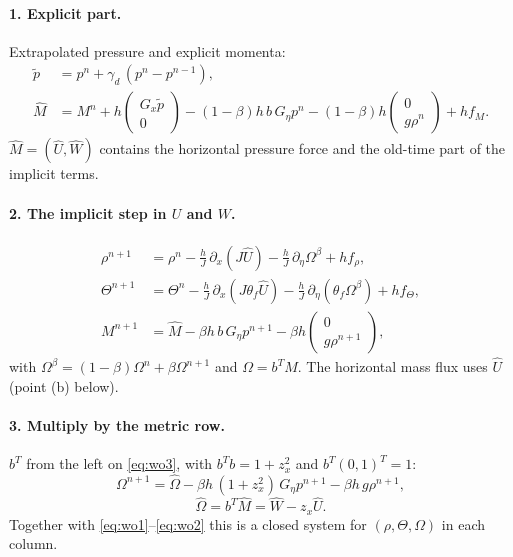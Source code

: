 \documentclass[11pt,a4paper]{article}
\begin{document}
\paragraph{1. Explicit part.} Extrapolated pressure and explicit momenta:
\begin{align*}
\tilde p&=p^n+\gamma_d\,(p^n-p^{n-1}),\\
\hat M&=M^n+h\begin{pmatrix}G_x\tilde p\\ 0\end{pmatrix}-(1-\beta)h\,b\,G_\eta p^n-(1-\beta)h\begin{pmatrix}0\\ g\rho^n\end{pmatrix}+hf_M .
\end{align*}
$\hat M=(\hat U,\hat W)$ contains the horizontal pressure force and the old-time part of the implicit terms.

\paragraph{2. The implicit step in $U$ and $W$.}
\begin{align}
\rho^{n+1}&=\rho^n-\frac hJ\,\partial_x(J\hat U)-\frac hJ\,\partial_\eta\Omega^\beta+hf_\rho,\label{eq:wo1}\\
\Theta^{n+1}&=\Theta^n-\frac hJ\,\partial_x(J\theta_f\hat U)-\frac hJ\,\partial_\eta(\theta_f\Omega^\beta)+hf_\Theta,\label{eq:wo2}\\
M^{n+1}&=\hat M-\beta h\,b\,G_\eta p^{n+1}-\beta h\begin{pmatrix}0\\ g\rho^{n+1}\end{pmatrix},\label{eq:wo3}
\end{align}
with $\Omega^\beta=(1-\beta)\Omega^n+\beta\Omega^{n+1}$ and $\Omega=b^TM$. The horizontal mass flux uses $\hat U$ (point (b) below).

\paragraph{3. Multiply by the metric row.} $b^T$ from the left on \eqref{eq:wo3}, with $b^Tb=1+z_x^2$ and $b^T(0,1)^T=1$:
\[
\Omega^{n+1}=\hat\Omega-\beta h\,(1+z_x^2)\,G_\eta p^{n+1}-\beta h\,g\rho^{n+1},
\]
\[
\hat\Omega=b^T\hat M=\hat W-z_x\hat U .
\]
Together with \eqref{eq:wo1}--\eqref{eq:wo2} this is a closed system for $(\rho,\Theta,\Omega)$ in each column.
\end{document}
